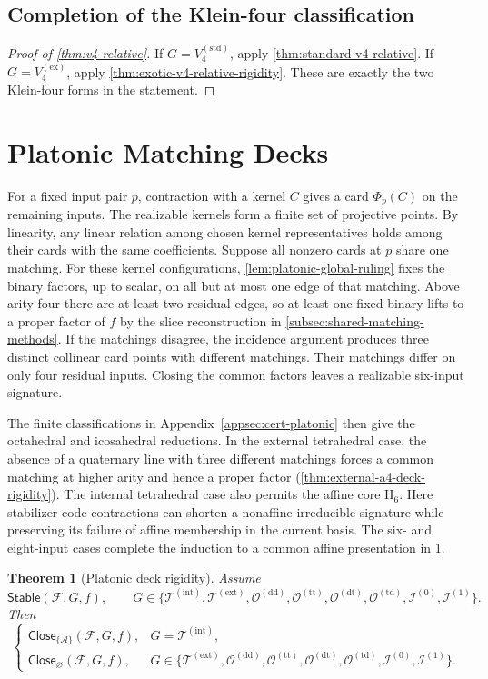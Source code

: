 \documentclass[11pt,letterpaper,onecolumn]{article}
\theoremstyle{plain}
\newtheorem{theorem}{Theorem}[section]
\theoremstyle{definition}
\theoremstyle{remark}
\newcommand{\cF}{\mathcal F}
\newcommand{\cA}{\mathscr A}
\newcommand{\KleinStd}{{V_4^{(\mathrm{std})}}}
\newcommand{\KleinEx}{{V_4^{(\mathrm{ex})}}}
\newcommand{\TetInt}{{\mathcal T^{(\mathrm{int})}}}
\newcommand{\TetExt}{{\mathcal T^{(\mathrm{ext})}}}
\newcommand{\OctDD}{{\mathcal O^{(\mathrm{dd})}}}
\newcommand{\OctTT}{{\mathcal O^{(\mathrm{tt})}}}
\newcommand{\OctDT}{{\mathcal O^{(\mathrm{dt})}}}
\newcommand{\OctTD}{{\mathcal O^{(\mathrm{td})}}}
\newcommand{\IcoZero}{{\mathcal I^{(0)}}}
\newcommand{\IcoOne}{{\mathcal I^{(1)}}}
\newcommand{\Stable}{\mathsf{Stable}}
\newcommand{\Close}{\mathsf{Close}}
\newcommand{\Hcore}{\mathrm{H}_6}
\begin{document}
\subsection{Completion of the Klein-four classification}

\begin{proof}[Proof of \cref{thm:v4-relative}]
If \(G=\KleinStd\), apply \cref{thm:standard-v4-relative}.  If
\(G=\KleinEx\), apply
\cref{thm:exotic-v4-relative-rigidity}.  These are exactly the two
Klein-four forms in the statement.
\end{proof}
\section{Platonic Matching Decks}
\label{sec:platonic-decks}

For a fixed input pair \(p\), contraction with a kernel \(C\) gives a
card \(\Phi_p(C)\) on the remaining inputs. The realizable kernels form a
finite set of projective points. By linearity, any linear relation among
chosen kernel representatives holds among their cards with the same
coefficients. Suppose all nonzero cards at \(p\) share one matching.
For these kernel configurations, \cref{lem:platonic-global-ruling} fixes
the binary factors, up to scalar, on all but at most one edge of that
matching. Above arity four there are at least two residual edges, so
at least one fixed binary lifts to a proper factor of \(f\) by the
slice reconstruction in \cref{subsec:shared-matching-methods}.
If the matchings disagree, the incidence argument produces
three distinct collinear card points with different matchings. Their
matchings differ on only four residual inputs. Closing the common factors
leaves a realizable six-input signature.

The finite classifications in Appendix~\ref{appsec:cert-platonic}
then give the octahedral and icosahedral reductions.
In the external tetrahedral case, the absence of a quaternary line with
three different matchings forces a common matching at higher arity and
hence a proper factor (\cref{thm:external-a4-deck-rigidity}).
The internal tetrahedral case also permits the affine core \(\Hcore\).
Here stabilizer-code contractions can shorten a nonaffine irreducible
signature while preserving its failure of affine membership in the
current basis. The six- and eight-input cases complete the induction
to a common affine presentation in \cref{thm:platonic-decks}.

\begin{theorem}[Platonic deck rigidity]
\label{thm:platonic-decks}
Assume
\[
 \Stable(\cF,G,f),\qquad
 G\in\{\TetInt,\TetExt,\OctDD,\OctTT,
         \OctDT,\OctTD,
         \IcoZero,\IcoOne\}.
\]
Then
\[
 \begin{cases}
  \Close_{\{\cA\}}(\cF,G,f),&G=\TetInt,\\
  \Close_{\varnothing}(\cF,G,f),
    &G\in\{\TetExt,\OctDD,\OctTT,
            \OctDT,\OctTD,
            \IcoZero,\IcoOne\}.
 \end{cases}
\]
\end{theorem}
\end{document}
